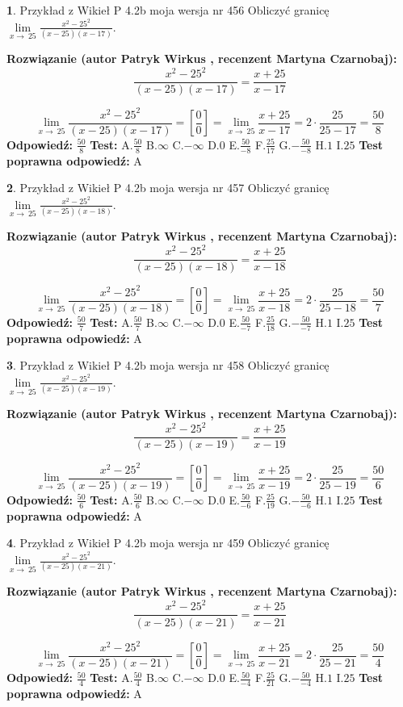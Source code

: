\documentclass[12pt, a4paper]{article}
\theoremstyle{definition} %
\newtheorem{zad}{}
\newcommand{\zadStart}[1]{\begin{zad}#1\newline}
\newcommand{\zadStop}{\end{zad}}
\newcommand{\rozwStart}[2]{\noindent \textbf{Rozwiązanie (autor #1 , recenzent #2): }\newline}
\newcommand{\rozwStop}{\newline}
\newcommand{\odpStart}{\noindent \textbf{Odpowiedź:}\newline}
\newcommand{\odpStop}{\newline}
\newcommand{\testStart}{\noindent \textbf{Test:}\newline}
\newcommand{\testStop}{\newline}
\newcommand{\kluczStart}{\noindent \textbf{Test poprawna odpowiedź:}\newline}
\newcommand{\kluczStop}{\newline}
\begin{document}
\zadStart{Przykład z Wikieł P 4.2b moja wersja nr 456}
Obliczyć granicę $\lim\limits_{x\to\ 25}\frac{x^{2}-25^{2}}{(x-25)(x-17)}$.
\zadStop
\rozwStart{Patryk Wirkus}{Martyna Czarnobaj}
$$\frac{x^{2}-25^{2}}{(x-25)(x-17)}=\frac{x+25}{x-17}$$

$$\lim\limits_{x\to\ 25}\frac{x^{2}-25^{2}}{(x-25)(x-17)}=[\frac{0}{0}]=\lim\limits_{x\to\ 25}\frac{x+25}{x-17}=2 \cdot \frac{25}{25-17} = \frac{50}{8}$$
\rozwStop
\odpStart
$\frac{50}{8}$
\odpStop
\testStart
A.$\frac{50}{8}$
B.$\infty$
C.$-\infty$
D.$0$
E.$\frac{50}{-8}$
F.$\frac{25}{17}$
G.$-\frac{50}{-8}$
H.$1$
I.$25$
\testStop
\kluczStart
A
\kluczStop



\zadStart{Przykład z Wikieł P 4.2b moja wersja nr 457}
Obliczyć granicę $\lim\limits_{x\to\ 25}\frac{x^{2}-25^{2}}{(x-25)(x-18)}$.
\zadStop
\rozwStart{Patryk Wirkus}{Martyna Czarnobaj}
$$\frac{x^{2}-25^{2}}{(x-25)(x-18)}=\frac{x+25}{x-18}$$

$$\lim\limits_{x\to\ 25}\frac{x^{2}-25^{2}}{(x-25)(x-18)}=[\frac{0}{0}]=\lim\limits_{x\to\ 25}\frac{x+25}{x-18}=2 \cdot \frac{25}{25-18} = \frac{50}{7}$$
\rozwStop
\odpStart
$\frac{50}{7}$
\odpStop
\testStart
A.$\frac{50}{7}$
B.$\infty$
C.$-\infty$
D.$0$
E.$\frac{50}{-7}$
F.$\frac{25}{18}$
G.$-\frac{50}{-7}$
H.$1$
I.$25$
\testStop
\kluczStart
A
\kluczStop



\zadStart{Przykład z Wikieł P 4.2b moja wersja nr 458}
Obliczyć granicę $\lim\limits_{x\to\ 25}\frac{x^{2}-25^{2}}{(x-25)(x-19)}$.
\zadStop
\rozwStart{Patryk Wirkus}{Martyna Czarnobaj}
$$\frac{x^{2}-25^{2}}{(x-25)(x-19)}=\frac{x+25}{x-19}$$

$$\lim\limits_{x\to\ 25}\frac{x^{2}-25^{2}}{(x-25)(x-19)}=[\frac{0}{0}]=\lim\limits_{x\to\ 25}\frac{x+25}{x-19}=2 \cdot \frac{25}{25-19} = \frac{50}{6}$$
\rozwStop
\odpStart
$\frac{50}{6}$
\odpStop
\testStart
A.$\frac{50}{6}$
B.$\infty$
C.$-\infty$
D.$0$
E.$\frac{50}{-6}$
F.$\frac{25}{19}$
G.$-\frac{50}{-6}$
H.$1$
I.$25$
\testStop
\kluczStart
A
\kluczStop



\zadStart{Przykład z Wikieł P 4.2b moja wersja nr 459}
Obliczyć granicę $\lim\limits_{x\to\ 25}\frac{x^{2}-25^{2}}{(x-25)(x-21)}$.
\zadStop
\rozwStart{Patryk Wirkus}{Martyna Czarnobaj}
$$\frac{x^{2}-25^{2}}{(x-25)(x-21)}=\frac{x+25}{x-21}$$

$$\lim\limits_{x\to\ 25}\frac{x^{2}-25^{2}}{(x-25)(x-21)}=[\frac{0}{0}]=\lim\limits_{x\to\ 25}\frac{x+25}{x-21}=2 \cdot \frac{25}{25-21} = \frac{50}{4}$$
\rozwStop
\odpStart
$\frac{50}{4}$
\odpStop
\testStart
A.$\frac{50}{4}$
B.$\infty$
C.$-\infty$
D.$0$
E.$\frac{50}{-4}$
F.$\frac{25}{21}$
G.$-\frac{50}{-4}$
H.$1$
I.$25$
\testStop
\kluczStart
A
\kluczStop
\end{document}
